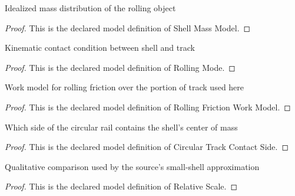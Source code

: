 \begin{definition}
  \label{def:physics:phyx-mini-0786:phyxminiproblems-problemphyxmini0786-shellmassmodel}
  Idealized mass distribution of the rolling object
\end{definition}
\begin{proof}
  This is the declared model definition of Shell Mass Model.
\end{proof}
\begin{definition}
  \label{def:physics:phyx-mini-0786:phyxminiproblems-problemphyxmini0786-rollingmode}
  Kinematic contact condition between shell and track
\end{definition}
\begin{proof}
  This is the declared model definition of Rolling Mode.
\end{proof}
\begin{definition}
  \label{def:physics:phyx-mini-0786:phyxminiproblems-problemphyxmini0786-rollingfrictionworkmodel}
  Work model for rolling friction over the portion of track used here
\end{definition}
\begin{proof}
  This is the declared model definition of Rolling Friction Work Model.
\end{proof}
\begin{definition}
  \label{def:physics:phyx-mini-0786:phyxminiproblems-problemphyxmini0786-circulartrackcontactside}
  Which side of the circular rail contains the shell's center of mass
\end{definition}
\begin{proof}
  This is the declared model definition of Circular Track Contact Side.
\end{proof}
\begin{definition}
  \label{def:physics:phyx-mini-0786:phyxminiproblems-problemphyxmini0786-relativescale}
  Qualitative comparison used by the source's small-shell approximation
\end{definition}
\begin{proof}
  This is the declared model definition of Relative Scale.
\end{proof}
